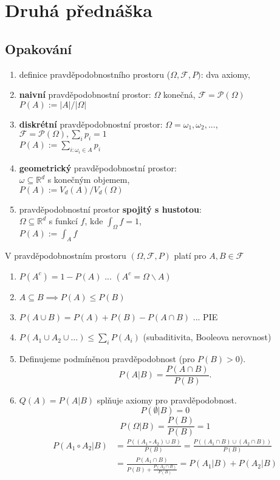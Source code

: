\documentclass[../main.tex]{subfiles}
\begin{document}
\section{Druhá přednáška}

\subsection{Opakování}

\begin{enumerate}
    \item definice pravděpodobnostního prostoru ($\Omega,\mathcal{F},P)$: dva axiomy,
    \item \textbf{naivní} pravděpodobnostní prostor: $\Omega$ konečná, $\mathcal{F} = \mathcal{P}(\Omega)$\\
    $P(A):=|A|/|\Omega|$
    \item \textbf{diskrétní} pravděpodobnostní prostor: $\Omega = {\omega_1,\omega_2,...}$,\\
    $\mathcal{F} = \mathcal{P}(\Omega),\sum_i p_i = 1$\\
    $P(A) := \sum_{i:\omega_i \in A} p_i$
    \item \textbf{geometrický} pravděpodobnostní prostor:\\
    $\omega \subseteq \mathbb{R}^d$ s konečným objemem,\\
    $P(A) := V_d(A)/V_d(\Omega)$
    \item pravděpodobnostní prostor \textbf{spojitý s hustotou}:\\
    $\Omega \subseteq \mathbb{R}^d$ s funkcí $f$, kde $\int_\Omega f = 1$,\\
    $P(A) := \int_A f$
\end{enumerate}

V pravděpodobnostním prostoru $(\Omega, \mathcal{F},P)$ platí pro $A,B \in \mathcal{F}$
\begin{enumerate}
    \item $P(A^c) = 1 - P(A)$ ... $(A^c = \Omega \backslash A)$
    \item $A \subseteq B \implies P(A) \leq P(B)$
    \item $P(A\cup B) = P(A) + P(B) - P(A \cap B)$ ... PIE
    \item $P(A_1 \cup A_2 \cup \dots) \leq \sum_i P(A_i)$ (subaditivita, Booleova nerovnost)
    \item Definujeme podmíněnou pravděpodobnost (pro $P(B) > 0$).
    \[P(A|B) = \frac{P(A\cap B)}{P(B)}.\]
    \item $Q(A) = P(A|B)$ splňuje axiomy pro pravděpodobnost.
    \[P(\emptyset | B) = 0\]
    \[P(\Omega | B) = \frac{P(B)}{P(B)} = 1\]
    \begin{align*}
        P(A_1 \circ A_2 | B) &= \frac{P((A_1\circ A_2)\cup B)}{P(B)} = \frac{P((A_1\cap B) \cup (A_2 \cap B))}{P(B)}\\ &= \frac{P(A_1\cap B)}{P(B) + \frac{P(A_2 \cap B)}{P(B)}}
        = P(A_1 | B) + P(A_2 | B)
    \end{align*}
\end{enumerate}
\end{document}
